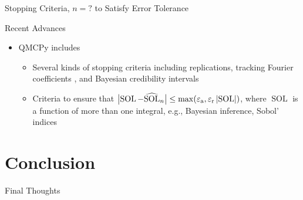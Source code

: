 \documentclass[11pt,compress,xcolor={usenames,dvipsnames},aspectratio=169]{beamer}
\DeclareMathOperator{\sol}{SOL}
\begin{document}
\begin{frame}{Stopping Criteria, $n = ?$ to Satisfy Error Tolerance}
	
	\begin{multicols}{2}
		{\Large \alert{Recent Advances}}
		\begin{itemize}
			\item QMCPy includes 
			\begin{itemize}
				\item Several kinds of stopping criteria including replications, tracking Fourier coefficients \cite{HicJim16a,JimHic16a}, and Bayesian credibility intervals \cite{RatHic19a}
				\item Criteria to ensure that $\bigl \lvert \sol - \widehat{\sol}_n \bigr \rvert \le   \max(\varepsilon_{\text{a}}, \varepsilon_{\text{r}} \abs{\sol})$, where
				$\sol$ is a function of more than one integral, e.g., Bayesian inference, Sobol' indices
			\end{itemize}
						
		\end{itemize}
		
		\columnbreak
		
		
	\end{multicols}
\end{frame}

\section{Conclusion}

\begin{frame}
	{Final Thoughts}
	
	\end{frame}




\thankyouframe

\printbibliography
\end{document}
